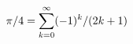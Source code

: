 \documentclass[preview]{standalone}
\begin{document}
\begin{align*}
\special{dvisvgm:raw <g id='unique000'>}\pi/4=\sum_{k=0}^\infty(-1)^k/(2k+1)\special{dvisvgm:raw </g>}
\end{align*}
\end{document}
